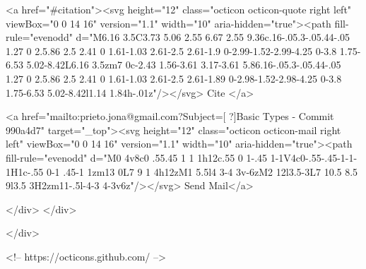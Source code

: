       <a  href="#citation"><svg height="12" class="octicon octicon-quote right left" viewBox="0 0 14 16" version="1.1" width="10" aria-hidden="true"><path fill-rule="evenodd" d="M6.16 3.5C3.73 5.06 2.55 6.67 2.55 9.36c.16-.05.3-.05.44-.05 1.27 0 2.5.86 2.5 2.41 0 1.61-1.03 2.61-2.5 2.61-1.9 0-2.99-1.52-2.99-4.25 0-3.8 1.75-6.53 5.02-8.42L6.16 3.5zm7 0c-2.43 1.56-3.61 3.17-3.61 5.86.16-.05.3-.05.44-.05 1.27 0 2.5.86 2.5 2.41 0 1.61-1.03 2.61-2.5 2.61-1.89 0-2.98-1.52-2.98-4.25 0-3.8 1.75-6.53 5.02-8.42l1.14 1.84h-.01z"/></svg> Cite
      </a>

      <a href="mailto:prieto.jona@gmail.com?Subject=[ ?]Basic Types - Commit 990a4d7" target="_top"><svg height="12" class="octicon octicon-mail right left" viewBox="0 0 14 16" version="1.1" width="10" aria-hidden="true"><path fill-rule="evenodd" d="M0 4v8c0 .55.45 1 1 1h12c.55 0 1-.45 1-1V4c0-.55-.45-1-1-1H1c-.55 0-1 .45-1 1zm13 0L7 9 1 4h12zM1 5.5l4 3-4 3v-6zM2 12l3.5-3L7 10.5 8.5 9l3.5 3H2zm11-.5l-4-3 4-3v6z"/></svg> Send Mail</a>

    </div>
  </div>

</div>

<!-- https://octicons.github.com/ -->





